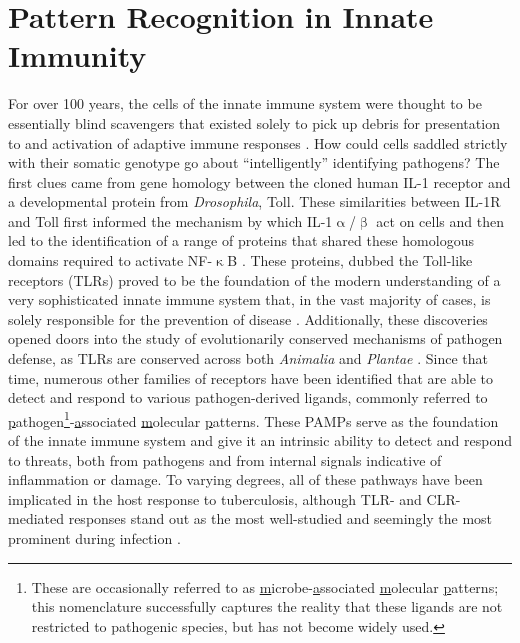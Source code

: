 \section{Pattern Recognition in Innate Immunity}\label{clrs}

For over 100 years, the cells of the innate immune system were thought to be essentially blind scavengers that existed solely to pick up debris for presentation to and activation of adaptive immune responses \citep{Iwasaki2010}. How could cells saddled strictly with their somatic genotype go about ``intelligently'' identifying pathogens? The first clues came from gene homology between the cloned human IL\hyp{}1 receptor and a developmental protein from \textit{Drosophila}, Toll. These similarities between IL\hyp{}1R and Toll first informed the mechanism by which IL\hyp{}1$\upalpha$/$\upbeta$ act on cells and then led to the identification of a range of proteins that shared these homologous domains required to activate NF\hyp{}$\upkappa$B \citep{ONeill2013, Rock1998}. These proteins, dubbed the Toll\hyp{}like receptors (TLRs) proved to be the foundation of the modern understanding of a very sophisticated innate immune system that, in the vast majority of cases, is solely responsible for the prevention of disease \citep{Janeway2005}. Additionally, these discoveries opened doors into the study of evolutionarily conserved mechanisms of pathogen defense, as TLRs are conserved across both \textit{Animalia} and \textit{Plantae} \citep{Armant2002, Ausubel2005}. Since that time, numerous other families of receptors have been identified that are able to detect and respond to various pathogen\hyp{}derived ligands, commonly referred to \underline{p}athogen\footnote{These are occasionally referred to as \underline{m}icrobe\hyp{}\underline{a}ssociated \underline{m}olecular \underline{p}atterns; this nomenclature successfully captures the reality that these ligands are not restricted to pathogenic species, but has not become widely used.}\hyp{}\underline{a}ssociated \underline{m}olecular \underline{p}atterns. These PAMPs serve as the foundation of the innate immune system and give it an intrinsic ability to detect and respond to threats, both from pathogens and from internal signals indicative of inflammation or damage. To varying degrees, all of these pathways have been implicated in the host response to tuberculosis, although TLR\hyp{} and CLR\hyp{}mediated responses stand out as the most well\hyp{}studied and seemingly the most prominent during infection \citep{Stamm2015}.

